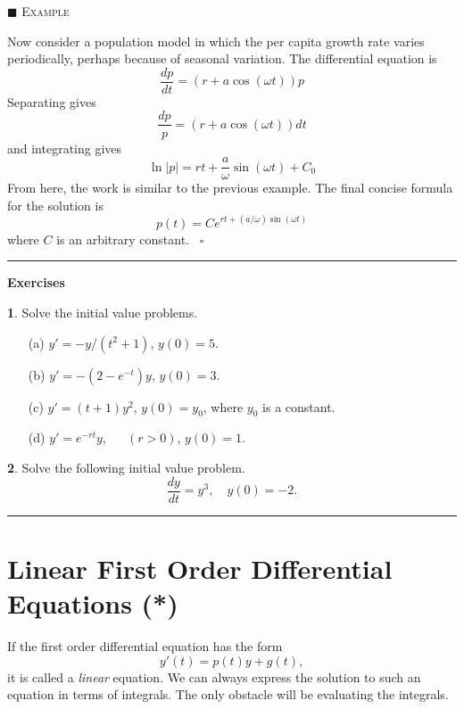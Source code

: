 \documentclass[reqno]{immbook}
\newcommand{\ds}{\displaystyle}
\numberwithin{equation}{chapter}
\numberwithin{question}{section}
\numberwithin{theorem}{chapter}
\numberwithin{figure}{chapter}
\theoremstyle{definition}
\newtheorem{exercise}{}[section]
\newenvironment{xexample}%
{%

\medskip\noindent\addtocounter{example}{1}$\blacksquare$ \textsc{Example \theexample}\hspace*{1em}%
}%
{%
~\hfill$\square$

\medskip
}
\newenvironment{exercises}%
{%
\medskip\hrule\medskip\noindent\textbf{Exercises}%
}%
{%
\medskip\hrule
}
\begin{document}
\begin{xexample}
Now consider a population model in which the per capita growth
rate varies periodically, perhaps because of seasonal variation.
The differential equation is
\begin{equation}
   \frac{dp}{dt} = (r + a\cos(\omega t))p
\end{equation}
Separating gives
\begin{equation}
  \frac{dp}{p} = \left( r+a\cos(\omega t) \right) dt
\end{equation}
and integrating gives
\begin{equation}
  \ln | p | = rt + \frac{a}{\omega} \sin(\omega t) + C_0
\end{equation}
From here, the work is similar to the previous example.
The final concise formula for the solution is
\begin{equation}
   p(t) = Ce^{rt + (a/\omega)\sin(\omega t)}
\end{equation}
where $C$ is an arbitrary constant.
\end{xexample}
%
\begin{exercises}
\begin{exercise}
Solve the initial value problems.
\begin{enumerate}
\item[(a)] $\ds y' = -y/(t^2+1)$, \hspace{0.25cm} $y(0)=5$.
\item[(b)] $\ds y' = -\left(2-e^{-t}\right)y$, \hspace{0.25cm} $y(0)=3$.
\item[(c)] $\ds y' = (t+1)y^2$, \hspace{0.25cm} $y(0)=y_0$, where $y_0$ is
a constant.
\item[(d)] $\ds y' = e^{-rt}y$, ~~ $(r > 0)$, \hspace{0.25cm}
                                       $y(0)=1$.
\end{enumerate}
\end{exercise}
\begin{exercise}
\label{ex:SolveFirstOrderYCubed}
Solve the following initial value problem.
\[
  \frac{dy}{dt} = y^3, \quad y(0)=-2.
\]
\end{exercise}
\end{exercises}
%

\newpage

\section{Linear First Order Differential Equations (*)}
\label{sec:LinearFirstOrder}
If the first order differential equation has the form
\begin{equation}
    y'(t) = p(t) y + g(t),
\label{eqn:linear}
\end{equation}
it is called a \emph{linear} equation.
We can always express the solution to such an equation
in terms of integrals.  The only obstacle will be
evaluating the integrals.
\end{document}

